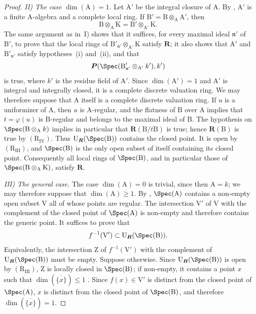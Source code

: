 \begin{proof}
\emph{II) The case $\dim(\mathrm{A})=1$.} Let $\mathrm{A}'$ be the integral closure of $\mathrm{A}$. By , $\mathrm{A}'$ is a finite $\mathrm{A}$-algebra and a complete local ring. If $\mathrm{B}'=\mathrm{B}\otimes_\mathrm{A}\mathrm{A}'$, then
\[
  \mathrm{B}\otimes_\mathrm{A}\mathrm{K}=\mathrm{B}'\otimes_{\mathrm{A}'}\mathrm{K}.
\]
The same argument as in~I) shows that it suffices, for every maximal ideal $\mathfrak{n}'$ of $\mathrm{B}'$, to prove that the local rings of $\mathrm{B}'_{\mathfrak{n}'}\otimes_{\mathrm{A}'}\mathrm{K}$ satisfy $\boldsymbol{R}$; it also shows that $\mathrm{A}'$ and $\mathrm{B}'_{\mathfrak{n}'}$ satisfy hypotheses~(i) and~(ii), and that
\[
  \boldsymbol{P}(\Spec(\mathrm{B}'_{\mathfrak{n}'}\otimes_{\mathrm{A}'}k'),k')
\]
is true, where $k'$ is the residue field of $\mathrm{A}'$. Since $\dim(\mathrm{A}')=1$  and $\mathrm{A}'$ is integral and integrally closed, it is a complete discrete valuation ring. We may therefore suppose that $\mathrm{A}$ itself is a complete discrete valuation ring. If $u$ is a uniformizer of $\mathrm{A}$, then $u$ is $\mathrm{A}$-regular, and the flatness of $\mathrm{B}$ over $\mathrm{A}$ implies that $t=\varphi(u)$ is $\mathrm{B}$-regular and belongs to the maximal ideal of $\mathrm{B}$. The hypothesis on $\Spec(\mathrm{B}\otimes_\mathrm{A}k)$ implies in particular that $\boldsymbol{R}(\mathrm{B}/t\mathrm{B})$ is true; hence $\boldsymbol{R}(\mathrm{B})$ is true by $(\mathrm{R}_{\mathrm{IV}})$. Thus $\mathrm{U}_{\boldsymbol{R}}(\Spec(\mathrm{B}))$ contains the closed point. It is open by $(\mathrm{R}_{\mathrm{III}})$, and $\Spec(\mathrm{B})$ is the only open subset of itself containing its closed point. Consequently all local rings of $\Spec(\mathrm{B})$, and in particular those of $\Spec(\mathrm{B}\otimes_\mathrm{A}\mathrm{K})$, satisfy $\boldsymbol{R}$.

\emph{III) The general case.} The case $\dim(\mathrm{A})=0$ is trivial, since then $\mathrm{A}=k$; we may therefore suppose that $\dim(\mathrm{A})\geqslant1$. By , $\Spec(\mathrm{A})$ contains a non-empty open subset $\mathrm{V}$ all of whose points are regular. The intersection $\mathrm{V}'$ of $\mathrm{V}$ with the complement of the closed point of $\Spec(\mathrm{A})$ is non-empty and therefore contains the generic point. It suffices to prove that
\[
  f^{-1}(\mathrm{V}')\subset\mathrm{U}_{\boldsymbol{R}}(\Spec(\mathrm{B})).
\]
Equivalently, the intersection $\mathrm{Z}$ of $f^{-1}(\mathrm{V}')$ with the complement of $\mathrm{U}_{\boldsymbol{R}}(\Spec(\mathrm{B}))$ must be empty. Suppose otherwise. Since $\mathrm{U}_{\boldsymbol{R}}(\Spec(\mathrm{B}))$ is open by $(\mathrm{R}_{\mathrm{III}})$, $\mathrm{Z}$ is locally closed in $\Spec(\mathrm{B})$; if non-empty, it contains a point $x$ such that $\dim(\overline{\{x\}})\leqslant1$ . Since $f(x)\in\mathrm{V}'$ is distinct from the closed point of $\Spec(\mathrm{A})$, $x$ is distinct from the closed point of $\Spec(\mathrm{B})$, and therefore $\dim(\overline{\{x\}})=1$.


\end{proof}
